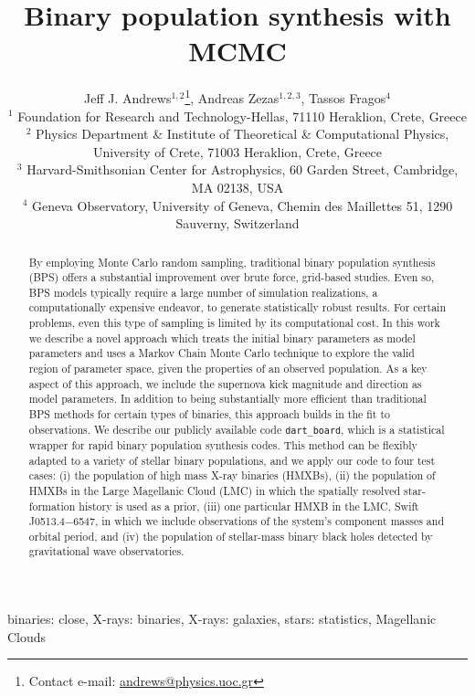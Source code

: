\documentclass[usenatbib]{mnras}
\title[Pop. synth. with MCMC]{Binary population synthesis with MCMC}
\author[J. J. Andrews et al.]{Jeff J. Andrews$^{1,2}$\thanks{Contact e-mail: \href{mailto:andrews@physics.uoc.gr}{andrews@physics.uoc.gr}}, Andreas Zezas$^{1,2,3}$, Tassos Fragos$^{4}$ \\
$^1$ Foundation for Research and Technology-Hellas, 71110 Heraklion, Crete, Greece \\
$^2$ Physics Department \& Institute of Theoretical \& Computational Physics, University of Crete, 71003 Heraklion, Crete, Greece \\
$^3$ Harvard-Smithsonian Center for Astrophysics, 60 Garden Street, Cambridge, MA 02138, USA \\
$^4$ Geneva Observatory, University of Geneva, Chemin des Maillettes 51, 1290 Sauverny, Switzerland }
\newcommand{\dart}{{\tt dart\_board}}
\begin{document}
\label{firstpage}
\pagerange{\pageref{firstpage}--\pageref{lastpage}}
\maketitle

\begin{abstract}
By employing Monte Carlo random sampling, traditional binary population synthesis (BPS) offers a substantial improvement over brute force, grid-based studies. Even so, BPS models typically require a large number of simulation realizations, a computationally expensive endeavor, to generate statistically robust results. For certain problems, even this type of sampling is limited by its computational cost. In this work we describe a novel approach which treats the initial binary parameters as model parameters and uses a Markov Chain Monte Carlo technique to explore the valid region of parameter space, given the properties of an observed population. As a key aspect of this approach, we include the supernova kick magnitude and direction as model parameters. In addition to being substantially more efficient than traditional BPS methods for certain types of binaries, this approach builds in the fit to observations. We describe our publicly available code \dart, which is a statistical wrapper for rapid binary population synthesis codes. This method can be flexibly adapted to a variety of stellar binary populations, and we apply our code to four test cases: (i) the population of high mass X-ray binaries (HMXBs), (ii) the population of HMXBs in the Large Magellanic Cloud (LMC) in which the spatially resolved star-formation history is used as a prior, (iii) one particular HMXB in the LMC, Swift J0513.4$-$6547, in which we include observations of the system's component masses and orbital period, and (iv) the population of stellar-mass binary black holes detected by gravitational wave observatories. 
\end{abstract}

\begin{keywords}
binaries: close, X-rays: binaries, X-rays: galaxies, stars: statistics, Magellanic Clouds
\end{keywords}
\end{document}
